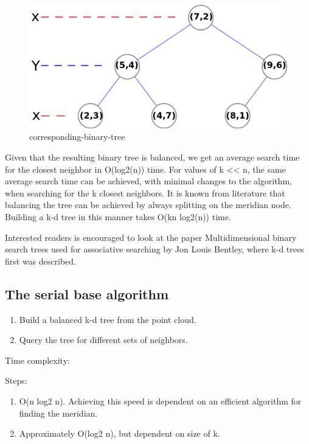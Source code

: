 \begin{figure}[ht!]
\centering
\includegraphics[width=120mm]{../gfx/Tree_0001.png}

\caption{corresponding-binary-tree}
\label{fig:tree_0001}
\end{figure}

Given that the resulting binary tree is balanced, we get an average search time for the closest neighbor in O(log2(n)) time. For values of k << n, the same average search time can be achieved, with minimal changes to the algorithm, when searching for the k closest neighbors. It is known from literature that balancing the tree can be achieved by always splitting on the meridian node. Building a k-d tree in this manner takes O(kn log2(n)) time.

Interested readers is encouraged to look at the paper Multidimensional binary search trees used for associative searching by Jon Louis Bentley, where k-d trees first was described.





\subsection{The serial base algorithm} %
\label{ssub:the_serial_base_algorithm}

\begin{enumerate}
    \item Build a balanced k-d tree from the point cloud.
    \item Query the tree for different sets of neighbors.
\end{enumerate}

Time complexity:

Steps:
\begin{enumerate}
    \item O(n log2 n). Achieving this speed is dependent on an efficient algorithm for finding the meridian.
    \item Approximately O(log2 n), but dependent on size of k.
\end{enumerate}

